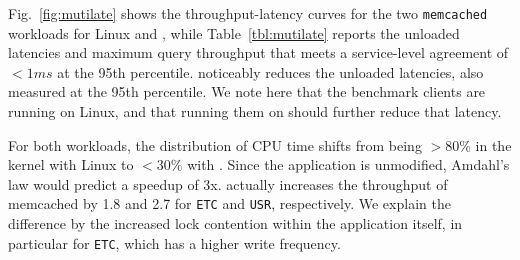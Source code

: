 


 Fig.~\ref{fig:mutilate} shows the throughput-latency curves for the
two \texttt{memcached} workloads for Linux and \ix, while
Table~\ref{tbl:mutilate} reports the unloaded latencies and maximum query throughput that meets a service-level agreement of $<1ms$ at the 95th percentile.
\ix noticeably reduces the unloaded latencies, also measured
at the 95th percentile.  We note here that the benchmark
clients are running on Linux, and that running them on \ix should
further reduce that latency. 

For both workloads, the distribution of CPU time shifts from being
$>80\%$ in the kernel with Linux to $<30\%$ with \ix.  Since the
application is unmodified, Amdahl's law would predict a speedup of 3x.
\ix actually increases the throughput of memcached by 1.8 and 2.7
for \texttt{ETC} and \texttt{USR}, respectively.  We explain the
difference by the increased lock contention within the application
itself, in particular for \texttt{ETC}, which has a higher write frequency.


%

